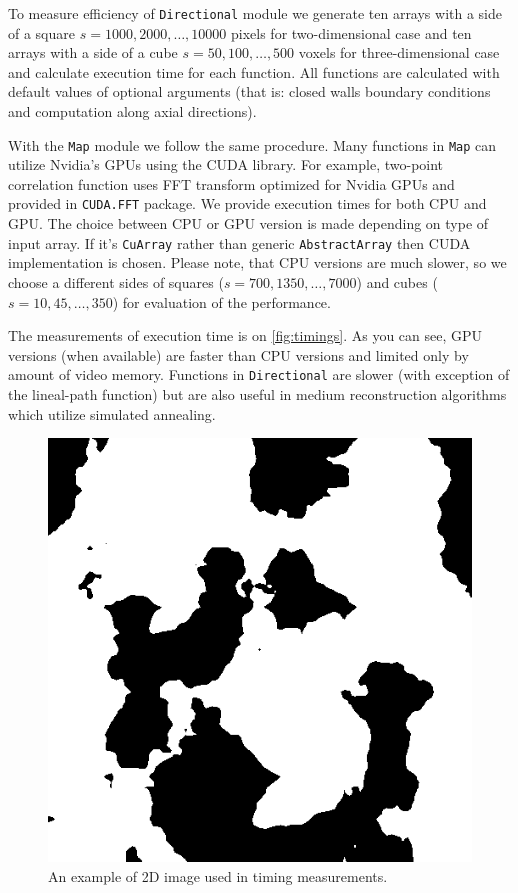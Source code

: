 \documentclass[reprint,amsmath,amssymb,aps,pre,showkeys,showpacs,nofootinbib]{revtex4-1}
\newcommand{\code}[1]{\colorbox{light-gray}{\texttt{#1}}}
\begin{document}
To measure efficiency of \code{Directional} module we generate ten arrays with
a side of a square $s = 1000, 2000, \dots, 10000$ pixels for two-dimensional
case and ten arrays with a side of a cube $s = 50, 100, \dots, 500$ voxels for
three-dimensional case and calculate execution time for each function. All
functions are calculated with default values of optional arguments (that is:
closed walls boundary conditions and computation along axial directions).

With the \code{Map} module we follow the same procedure. Many functions in
\code{Map} can utilize Nvidia's GPUs using the CUDA library. For example,
two-point correlation function uses FFT transform optimized for Nvidia GPUs and
provided in \code{CUDA.FFT} package. We provide execution times for both CPU and
GPU. The choice between CPU or GPU version is made depending on type of input
array. If it's \code{CuArray} rather than generic \code{AbstractArray} then CUDA
implementation is chosen. Please note, that CPU versions are much slower, so we
choose a different sides of squares ($s = 700, 1350, \dots, 7000$) and cubes
($s = 10, 45, \dots, 350$) for evaluation of the performance.

The measurements of execution time is on \cref{fig:timings}. As you can see, GPU
versions (when available) are faster than CPU versions and limited only by
amount of video memory. Functions in \code{Directional} are slower (with
exception of the lineal-path function) but are also useful in medium
reconstruction algorithms which utilize simulated annealing.

\begin{figure}[ht]
  \centering
  \includegraphics[width=0.9\linewidth]{images/timing-image.png}
  \caption[]{An example of 2D image used in timing measurements.}
  \label{fig:valuenoise}
\end{figure}
\end{document}
